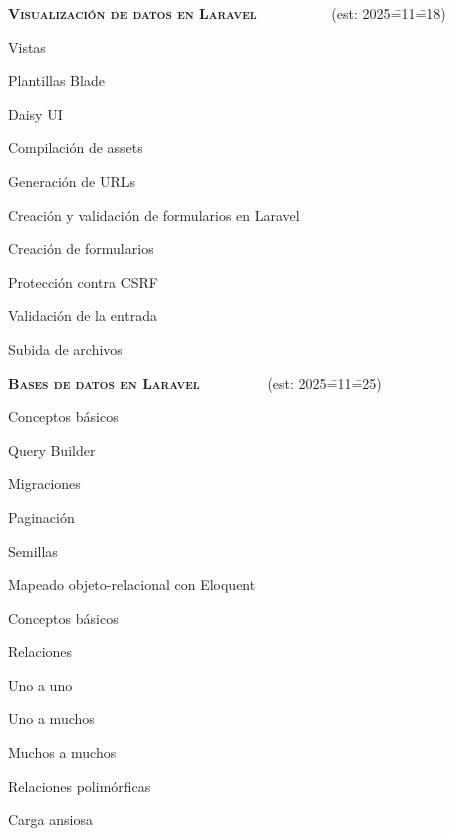 \begin{longenum}
    \item \textbf{\textsc{Visualización de datos en Laravel}} \ \ \ \ \ \ \ \ \ \ (est: 2025\==11\==18)
    \begin{longenum}
        \item Vistas
        \item Plantillas Blade
        \item Daisy UI
        \item Compilación de assets
        \item Generación de URLs
        \item Creación y validación de formularios en Laravel
        \begin{longenum}
            \item Creación de formularios
            \item Protección contra CSRF
            \item Validación de la entrada
            \item Subida de archivos
        \end{longenum}
    \end{longenum}
    \item \textbf{\textsc{Bases de datos en Laravel}} \ \ \ \ \ \ \ \ \ (est: 2025\==11\==25)
    \begin{longenum}
        \item Conceptos básicos
        \item Query Builder
        \item Migraciones
        \item Paginación
        \item Semillas
        \item Mapeado objeto-relacional con Eloquent
        \begin{longenum}
            \item Conceptos básicos
            \item Relaciones
            \begin{longenum}
                \item Uno a uno
                \item Uno a muchos
                \item Muchos a muchos
                \item Relaciones polimórficas
                \item Carga ansiosa
                \begin{longenum}

\end{longenum}
\end{longenum}
\end{longenum}
\end{longenum}
\end{longenum}
